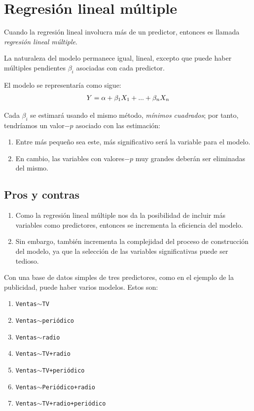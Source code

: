 \section{Regresión lineal múltiple}

Cuando la regresión lineal involucra más de un predictor, entonces es llamada \emph{regresión lineal múltiple}.



La naturaleza del modelo permanece igual, lineal, excepto que puede haber múltiples pendientes $\beta_{i}$ asociadas con cada predictor.




El modelo se representaría como sigue:
\begin{align}
	Y = \alpha + \beta_{1}X_{1}+...+\beta_{n}X_{n}
\end{align}



Cada $\beta_{i}$ se estimará usando el mismo método, \emph{mínimos cuadrados}; por tanto, tendríamos un valor$-p$ asociado con las estimación: 
\begin{enumerate}
	\item Entre más pequeño sea este, más significativo será la variable para el modelo. 
	\item En cambio, las variables con valores$-p$ muy grandes deberán ser eliminadas del mismo.
\end{enumerate}


\subsection{Pros y contras}
\begin{enumerate}
	\item Como la regresión lineal múltiple nos da la posibilidad de incluir más variables como predictores, entonces se incrementa la eficiencia del modelo. 
	
	\item Sin embargo, también incrementa la complejidad del proceso de construcción del modelo, ya que la selección de las variables significativas puede ser tedioso.
\end{enumerate}


Con una base de datos simples de tres predictores, como en el ejemplo de la publicidad, puede haber varios modelos. Estos son:
\begin{enumerate}[Modelo 1:]
	\item \texttt{Ventas$\sim$TV}
	\item \texttt{Ventas$\sim$periódico}
	\item \texttt{Ventas$\sim$radio}
	\item \texttt{Ventas$\sim$TV+radio}
	\item \texttt{Ventas$\sim$TV+periódico}
	\item \texttt{Ventas$\sim$Periódico+radio}
	\item \texttt{Ventas$\sim$TV+radio+periódico}
\end{enumerate}



